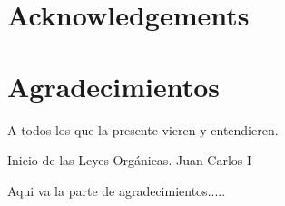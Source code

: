 %
%
%
% 
%
%
%
%

\thispagestyle{empty}

{
  \chapter*{Acknowledgements}
  \label{cha:acknowledgements}
}
{
  \chapter*{Agradecimientos}
  \label{cha:agradecimientos}
}




\begin{FraseCelebre}
  \begin{Frase}
    A todos los que la presente vieren y entendieren.
  \end{Frase}
  \begin{Fuente}
    Inicio de las Leyes Orgánicas. Juan Carlos I
  \end{Fuente}
\end{FraseCelebre}



Aqui va la parte de agradecimientos.....

% 






